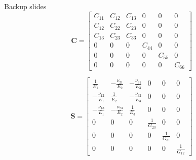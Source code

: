 \documentclass[10pt]{beamer} %
\newcommand{\matr}[1]{\mathbf{#1}} %
\begin{document}
\begin{frame}[fragile]{Backup slides}
 \begin{equation*}
\matr{C} = \left[\begin{array}{cccccc} C_{11} & C_{12}& C_{13} & 0&0&0\\[2pt]
C_{12}& C_{22} & C_{23}& 0&0&0\\[2pt]
C_{13}&C_{23}&C_{33}&0&0&0\\[2pt]
0& 0 &0&C_{44}& 0&0\\[2pt]
0&0&0&0&C_{55}&0\\[2pt]
0&0&0&0&0&C_{66}
\end{array}\right]
\label{eq:elastic_constatns}
\end{equation*} 

\begin{equation*}
\matr{S} = \left[\begin{array}{cccccc} \frac{1}{E_1} & - \frac{\nu_{21}}{E_2}& - \frac{\nu_{31}}{E_3} & 0&0&0\\[2pt]
- \frac{\nu_{12}}{E_1}& \frac{1}{E_2} & - \frac{\nu_{32}}{E_3} & 0&0&0\\[2pt]
- \frac{\nu_{13}}{E_1}&- \frac{\nu_{23}}{E_2}&\frac{1}{E_3} &0&0&0\\[2pt]
0& 0 &0&\frac{1}{G_{23}}& 0&0\\[2pt]
0&0&0&0&\frac{1}{G_{31}}&0\\[2pt]
0&0&0&0&0&\frac{1}{G_{12}}
\end{array}\right]
\label{eq:compliance_matrix}
\end{equation*} 
\end{frame}

\end{document}
